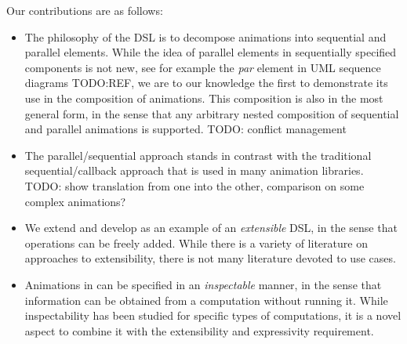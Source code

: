 Our contributions are as follows:
\begin{itemize}
\item The philosophy of the DSL is to decompose animations into sequential and parallel elements. While the idea of parallel elements in sequentially specified components is not new, see for example the \emph{par} element in UML sequence diagrams TODO:REF, we are to our knowledge the first to demonstrate its use in the composition of animations. This composition is also in the most general form, in the sense that any arbitrary nested composition of sequential and parallel animations is supported. TODO: conflict management
\item The parallel/sequential approach stands in contrast with the traditional sequential/callback approach that is used in many animation libraries. TODO: show translation from one into the other, comparison on some complex animations?
\item We extend and develop \dsl{} as an example of an \emph{extensible} DSL, in the sense that operations can be freely added. While there is a variety of literature on approaches to extensibility, there is not many literature devoted to use cases.
\item Animations in \dsl{} can be specified in an \emph{inspectable} manner, in the sense that information can be obtained from a computation without running it. While inspectability has been studied for specific types of computations, it is a novel aspect to combine it with the extensibility and expressivity requirement.
\end{itemize}

